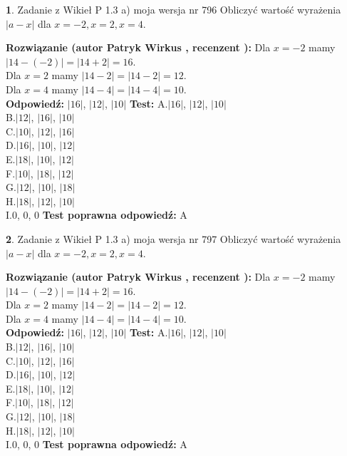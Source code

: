\documentclass[12pt, a4paper]{article}
\theoremstyle{definition} %
\newtheorem{zad}{}
\newcommand{\zadStart}[1]{\begin{zad}#1\newline}
\newcommand{\zadStop}{\end{zad}}
\newcommand{\rozwStart}[2]{\noindent \textbf{Rozwiązanie (autor #1 , recenzent #2): }\newline}
\newcommand{\rozwStop}{\newline}
\newcommand{\odpStart}{\noindent \textbf{Odpowiedź:}\newline}
\newcommand{\odpStop}{\newline}
\newcommand{\testStart}{\noindent \textbf{Test:}\newline}
\newcommand{\testStop}{\newline}
\newcommand{\kluczStart}{\noindent \textbf{Test poprawna odpowiedź:}\newline}
\newcommand{\kluczStop}{\newline}
\begin{document}
\zadStart{Zadanie z Wikieł P 1.3 a) moja wersja nr 796}
Obliczyć wartość wyrażenia $|a - x|$ dla $x=-2,x=2,x=4$.
\zadStop
\rozwStart{Patryk Wirkus}{}
Dla $x = -2$ mamy $|14 - (-2)| = |14 + 2| = 16$.\\
Dla $x = 2$ mamy $|14 - 2| = |14 - 2| = 12$.\\
Dla $x = 4$ mamy $|14 - 4| = |14 - 4| = 10$.\\
\rozwStop
\odpStart
$|16|$, $|12|$, $|10|$
\odpStop
\testStart
A.$|16|$, $|12|$, $|10|$\\
B.$|12|$, $|16|$, $|10|$\\
C.$|10|$, $|12|$, $|16|$\\
D.$|16|$, $|10|$, $|12|$\\
E.$|18|$, $|10|$, $|12|$\\
F.$|10|$, $|18|$, $|12|$\\
G.$|12|$, $|10|$, $|18|$\\
H.$|18|$, $|12|$, $|10|$\\
I.$0$, $0$, $0$
\testStop
\kluczStart
A
\kluczStop



\zadStart{Zadanie z Wikieł P 1.3 a) moja wersja nr 797}
Obliczyć wartość wyrażenia $|a - x|$ dla $x=-2,x=2,x=4$.
\zadStop
\rozwStart{Patryk Wirkus}{}
Dla $x = -2$ mamy $|14 - (-2)| = |14 + 2| = 16$.\\
Dla $x = 2$ mamy $|14 - 2| = |14 - 2| = 12$.\\
Dla $x = 4$ mamy $|14 - 4| = |14 - 4| = 10$.\\
\rozwStop
\odpStart
$|16|$, $|12|$, $|10|$
\odpStop
\testStart
A.$|16|$, $|12|$, $|10|$\\
B.$|12|$, $|16|$, $|10|$\\
C.$|10|$, $|12|$, $|16|$\\
D.$|16|$, $|10|$, $|12|$\\
E.$|18|$, $|10|$, $|12|$\\
F.$|10|$, $|18|$, $|12|$\\
G.$|12|$, $|10|$, $|18|$\\
H.$|18|$, $|12|$, $|10|$\\
I.$0$, $0$, $0$
\testStop
\kluczStart
A
\kluczStop
\end{document}
